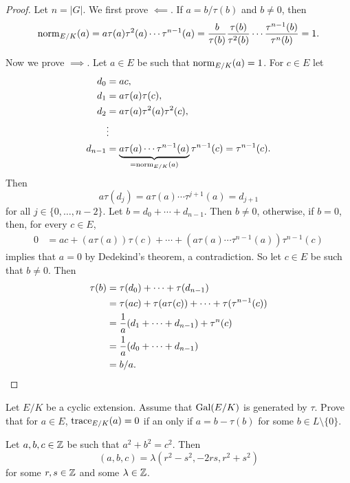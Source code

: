 \begin{proof}
    Let $n=|G|$. We first prove $\impliedby$. If $a=b/\tau(b)$ and $b\ne 0$, then 
    \[
    \operatorname{norm}_{E/K}(a)=a\tau(a)\tau^2(a)\cdots\tau^{n-1}(a)
    =\frac{b}{\tau(b)}\frac{\tau(b)}{\tau^2(b)}\cdots\frac{\tau^{n-1}(b)}{\tau^n(b)}=1.
    \]

    Now we prove $\implies$. Let $a\in E$ be such that $\operatorname{norm}_{E/K}(a)=1$. For 
    $c\in E$ let 
    \begin{align*}
        d_0 &= ac,\\
        d_1 &= a\tau(a)\tau(c),\\
        d_2 &= a\tau(a)\tau^2(a)\tau^2(c),\\
        &\vdots\\
        d_{n-1} &= \underbrace{a\tau(a)\cdots\tau^{n-1}(a)}_{=\operatorname{norm}_{E/K}(a)}\tau^{n-1}(c)=\tau^{n-1}(c).
    \end{align*}
    Then 
    \[
    a\tau(d_j)=a\tau(a)\cdots\tau^{j+1}(a)=d_{j+1}
    \]
    for all $j\in\{0,\dots,n-2\}$. Let $b=d_0+\cdots+d_{n-1}$. Then 
    $b\ne 0$, otherwise, if $b=0$, then, for every $c\in E$, 
    \begin{align*}
    0&=ac+(a\tau(a))\tau(c)+\cdots+(a\tau(a)\cdots\tau^{n-1}(a))\tau^{n-1}(c)
    \end{align*}
    implies that $a=0$ by Dedekind's theorem, a contradiction. So let $c\in E$ be
    such that $b\ne 0$. Then 
    \begin{align*}
    \tau(b)&=\tau(d_0)+\cdots+\tau(d_{n-1})\\
    &=\tau(ac)+\tau(a\tau(c))+\cdots+\tau(\tau^{n-1}(c))\\
    &=\frac{1}{a}(d_1+\cdots+d_{n-1})+\tau^n(c)\\
    &=\frac{1}{a}(d_0+\cdots+d_{n-1})\\
    &=b/a.\qedhere
    \end{align*}
\end{proof}

\begin{exercise}
    Let $E/K$ be a cyclic extension. Assume that 
    $\operatorname{Gal}(E/K)$ is generated by $\tau$. Prove that for 
    $a\in E$, $\operatorname{trace}_{E/K}(a)=0$ if an only 
    if $a=b-\tau(b)$ for some $b\in L\setminus\{0\}$.  
\end{exercise}

\begin{corollary}
    Let $a,b,c\in \mathbb{Z}$ be such that $a^2+b^2=c^2$. Then 
    \[
    (a,b,c)=\lambda(r^2-s^2,-2rs, r^2+s^2)
    \]
    for some $r,s\in\mathbb{Z}$ and some $\lambda\in\mathbb{Z}$.
\end{corollary}

